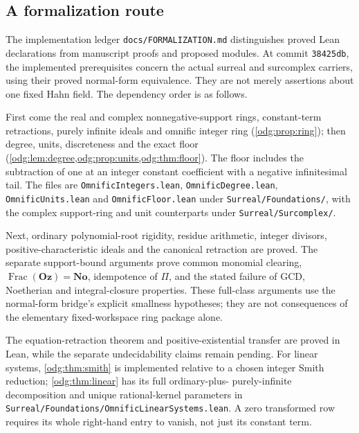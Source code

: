 \documentclass[11pt,oneside]{article}
\numberwithin{equation}{section}
\theoremstyle{definition}
\theoremstyle{remark}
\newcommand{\No}{\mathbf{No}}
\newcommand{\Oz}{\mathbf{Oz}}
\newcommand{\Frac}{\operatorname{Frac}}
\newcommand{\fn}[1]{\nolinkurl{#1}}
\begin{document}
\subsection{A formalization route}

The implementation ledger \fn{docs/FORMALIZATION.md} distinguishes proved
Lean declarations from manuscript proofs and proposed modules. At commit
\texttt{38425db}, the implemented prerequisites concern the actual surreal
and surcomplex carriers, using their proved normal-form equivalence. They
are not merely assertions about one fixed Hahn field. The dependency order
is as follows.

First come the real and complex nonnegative-support rings, constant-term
retractions, purely infinite ideals and omnific integer ring
(\cref{odg:prop:ring}); then degree, units, discreteness and the exact floor
(\cref{odg:lem:degree,odg:prop:units,odg:thm:floor}). The floor includes the
subtraction of one at an integer constant coefficient with a negative
infinitesimal tail. The files are \fn{OmnificIntegers.lean},
\fn{OmnificDegree.lean}, \fn{OmnificUnits.lean} and \fn{OmnificFloor.lean}
under \fn{Surreal/Foundations/}, with the complex support-ring and unit
counterparts under \fn{Surreal/Surcomplex/}.

Next, ordinary polynomial-root rigidity, residue arithmetic, integer
divisors, positive-characteristic ideals and the canonical retraction are
proved. The separate support-bound arguments prove common monomial
clearing, $\Frac(\Oz)=\No$, idempotence of $\Pi$, and the stated failure of
GCD, Noetherian and integral-closure properties. These full-class arguments
use the normal-form bridge's explicit smallness hypotheses; they are not
consequences of the elementary fixed-workspace ring package alone.

The equation-retraction theorem and positive-existential transfer are
proved in Lean, while the separate undecidability claims remain pending.
For linear systems, \cref{odg:thm:smith} is implemented relative to a chosen
integer Smith reduction; \cref{odg:thm:linear} has its full ordinary-plus-
purely-infinite decomposition and unique rational-kernel parameters in
\fn{Surreal/Foundations/OmnificLinearSystems.lean}. A zero transformed row
requires its whole right-hand entry to vanish, not just its constant term.
\end{document}
